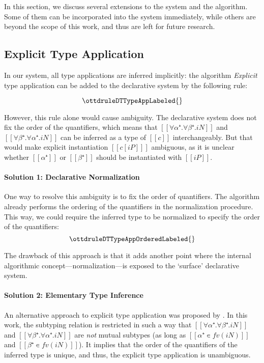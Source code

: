 \label{sec:extensions}

In this section, we discuss several extensions to the system and the algorithm.
Some of them can be incorporated into the system immediately, while others
are beyond the scope of this work, and thus are left for future research.

\subsection{Explicit Type Application}
\label{sec:explicit-type-application}

In our system, all type applications are inferred implicitly: the algorithm
\emph{Explicit} type application can be added to the declarative system by the following rule:

$$\ottdruleDTTypeAppLabeled{}$$

However, this rule alone would cause ambiguity. The declarative system does not
fix the order of the quantifiers, which means that $[[∀α⁺.∀β⁺.iN]]$ and
$[[∀β⁺.∀α⁺.iN]]$ can be inferred as a type of $[[c]]$ interchangeably. But that
would make explicit instantiation $[[ c[iP] ]]$ ambiguous, as it is unclear
whether $[[α⁺]]$ or $[[β⁺]]$ should be instantiated with $[[iP]]$.

\vspace{\baselineskip}
\paragraph*{Solution 1: Declarative Normalization}
One way to resolve this ambiguity is to fix the order of quantifiers.  
The algorithm already performs the ordering of the quantifiers in the normalization procedure.
This way, we could require the inferred type to be normalized
to specify the order of the quantifiers:
$$\ottdruleDTTypeAppOrderedLabeled{}$$

The drawback of this approach is that it adds another point where the internal
algorithmic concept---normalization---is exposed to the `surface' declarative
system.

\vspace{\baselineskip}
\paragraph*{Solution 2: Elementary Type Inference}
An alternative approach to explicit type application
 was proposed by \cite{zhao22:elementary}.
In this work, the subtyping relation is restricted 
in such a way that 
$[[∀α⁺.∀β⁺.iN]]$ and $[[∀β⁺.∀α⁺.iN]]$ are \emph{not} mutual subtypes 
(as long as $[[α⁺ ∊ fv(iN)]]$ and $[[β⁺ ∊ fv(iN)]]$).
It implies that the order of the quantifiers of the inferred type is unique,
and thus, the explicit type application is unambiguous.

